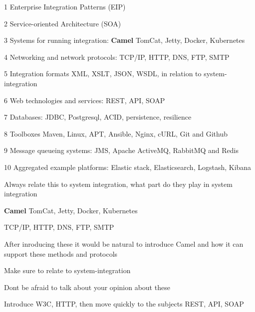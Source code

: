 \documentclass[Screen16to9,17pt]{foils}
\begin{document}
\begin{list2}
\item[1] Enterprise Integration Patterns (EIP)
\item[2] Service-oriented Architecture (SOA)
\item[3] Systems for running integration: {\bf Camel} TomCat, Jetty, Docker, Kubernetes
\item[4] Networking and network protocols: TCP/IP, HTTP, DNS, FTP, SMTP
\item[5] Integration formats XML, XSLT, JSON, WSDL, in relation to system-integration
\item[6] Web technologies and services: REST, API, SOAP
\item[7] Databases: JDBC, Postgresql, ACID, persistence, resilience
\item[8] Toolboxes Maven, Linux, APT, Ansible, Nginx, cURL, Git and Github
\item[9] Message queueing systems: JMS, Apache ActiveMQ, RabbitMQ and Redis
\item[10] Aggregated example platforms: Elastic stack,  Elasticsearch, Logstash, Kibana
\end{list2}

Always relate this to system integration, what part do they play in system integration







 {\bf Camel} TomCat, Jetty, Docker, Kubernetes



 TCP/IP, HTTP, DNS, FTP, SMTP

After inroducing these it would be natural to introduce Camel and how it can support these methods and protocols


Make sure to relate to system-integration

Dont be afraid to talk about your opinion about these



Introduce W3C, HTTP, then move quickly to the subjects REST, API, SOAP

\end{document}
